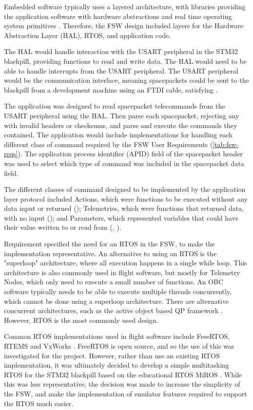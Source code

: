 \documentclass[../report.tex]{subfiles}
\begin{document}
Embedded software typically uses a layered architecture, with libraries
providing the application software with hardware abstractions and real time
operating system primitives \citep{Cratere_2024}. Therefore, the FSW design
included layers for the Hardware Abstraction Layer (HAL), RTOS, and application
code.

The HAL would handle interaction with the USART peripheral in the STM32
blackpill, providing functions to read and write data. The HAL would need to be
able to handle interrupts from the USART peripheral. The USART peripheral would
be the communication interface, meaning spacepackets could be sent to the
blackpill from a development machine using an FTDI cable, satisfying
.

The application was designed to read spacepacket telecommands from the USART
peripheral using the HAL. Then parse each spacepacket, rejecting any with
invalid headers or checksums, and parse and execute the commands they
contained. The application would include implementations for handling each
different class of command required by the FSW User Requirements
(\autoref{tab:fsw-reqs}). The application process identifier (APID) field of
the spacepacket header \citep{Ccsds_spp} was used to select which type of
command was included in the spacepacket data field.

The different classes of command designed to be implemented by the application
layer protocol included Actions, which were functions to be executed without
any data input or returned (); Telemetries, which were functions
that returned data, with no input (); and Parameters, which
represented variables that could have their value written to or read from
(, ).

Requirement  specified the need for an RTOS in the FSW, to make
the implementation representative. An alternative to using an RTOS is the
"superloop" architecture, where all execution happens in a single while loop.
This architecture is also commonly used in flight software, but mostly for
Telemetry Nodes, which only need to execute a small number of functions. An OBC
software typically needs to be able to execute multiple threads concurrently,
which cannot be done using a superloop architecture. There are alternative
concurrent architectures, such as the active object based QP framework
\citep{QP}. However, RTOS is the most commonly used design.

Common RTOS implementations used in flight software include FreeRTOS, RTEMS and
VxWorks \citep{Cratere_2024}. FreeRTOS is open source, and so the use of this
was investigated for the project. However, rather than use an existing RTOS
implementation, it was ultimately decided to develop a simple multitasking RTOS
for the STM32 blackpill based on the educational RTOS MiROS \citep{miros}.
While this was less representative, the decision was made to increase the
simplicity of the FSW, and make the implementation of emulator features
required to support the RTOS much easier.
\end{document}
